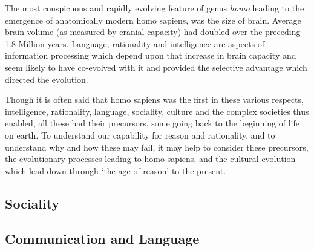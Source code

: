 \documentclass[10pt,titlepage]{article}
\begin{document}
The most conspicuous and rapidly evolving feature of genus \emph{homo} leading to the emergence of anatomically modern homo sapiens, was the size of brain.
Average brain volume (as measured by cranial capacity) had doubled over the preceding 1.8 Million years.
Language, rationality and intelligence are aspects of information processing which depend upon that increase in brain capacity and seem likely to have co-evolved with it and provided the selective advantage which directed the evolution.

Though it is often said that homo sapiens was the first in these various respects, intelligence, rationality, language, sociality, culture and the complex societies thus enabled, all these had their precursors, some going back to the beginning of life on earth.
To understand our capability for reason and rationality, and to understand why and how these may fail, it may help to consider these precursors, the evolutionary processes leading to homo sapiens, and the cultural evolution which lead down through `the age of reason' to the present.

\subsection{Sociality}

\subsection{Communication and Language}



\section{}

\cite{shapiro-tabp}

\cite{wilson-tvf}
\cite{berlinRR}
\cite{orwell-fd}


{}



\label{index}
{\twocolumn[]
{\small\printindex}}





\end{document}
